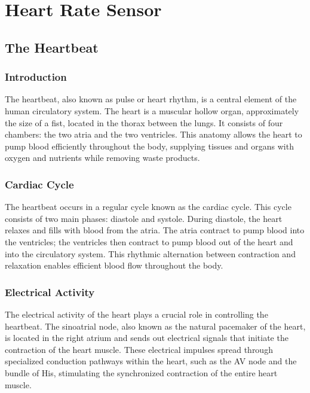 %
%
%
\chapter{Heart Rate Sensor}

\section{The Heartbeat}
{
    \subsection{Introduction}
    
    The heartbeat, also known as pulse or heart rhythm, is a central element of the human circulatory system. The heart is a muscular hollow organ, approximately the size of a fist, located in the thorax between the lungs. It consists of four chambers: the two atria and the two ventricles. This anatomy allows the heart to pump blood efficiently throughout the body, supplying tissues and organs with oxygen and nutrients while removing waste products. \cite{Gesenberg:2017}
    
    \subsection{Cardiac Cycle}
    
    The heartbeat occurs in a regular cycle known as the cardiac cycle. This cycle consists of two main phases: diastole and systole. During diastole, the heart relaxes and fills with blood from the atria. The atria contract to pump blood into the ventricles; the ventricles then contract to pump blood out of the heart and into the circulatory system. This rhythmic alternation between contraction and relaxation enables efficient blood flow throughout the body. \cite{Gesenberg:2017}
    
    \subsection{Electrical Activity}
    
    The electrical activity of the heart plays a crucial role in controlling the heartbeat. The sinoatrial node, also known as the natural pacemaker of the heart, is located in the right atrium and sends out electrical signals that initiate the contraction of the heart muscle. These electrical impulses spread through specialized conduction pathways within the heart, such as the AV node and the bundle of His, stimulating the synchronized contraction of the entire heart muscle. \cite{Gesenberg:2017}
    
}
